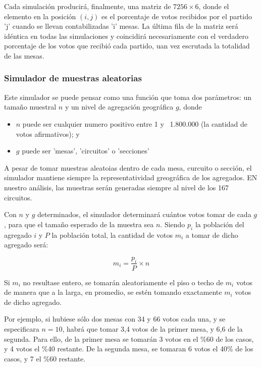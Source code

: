 \documentclass[12pt, a4paper]{article}
\begin{document}
Cada simulaci\'on producir\'a, finalmente, una matriz de $7256 \times 6$, donde el elemento en la posici\'on $(i,j)$ es el porcentaje de votos recibidos por el partido 'j' cuando se llevan contabilizadas 'i' mesas. La \'ultima fila de la matriz ser\'a id\'entica en todas las simulaciones y coincidir\'a necesariamente con el verdadero porcentaje de los votos que recibi\'o cada partido, uan vez escrutada la totalidad de las mesas.

\subsubsection{Simulador de muestras aleatorias}

Este simulador se puede pensar como una funci\'on que toma dos par\'ametros: un tama\~no muestral $n$ y un nivel de agregaci\'on geogr\'afica $g$, donde 

\begin{itemize}
	\item $n$ puede ser cualquier numero positivo entre 1 y ~1.800.000 (la cantidad de votos afirmativos); y
	\item $g$ puede ser 'mesas', 'circuitos' o 'secciones'
\end{itemize}

A pesar de tomar muestras aleatoias dentro de cada mesa, curcuito o secci\'on, el simulador mantiene siempre la representatividad greogr\'afica de los agregados. EN nuestro an\'alisis, las muestras ser\'an generadas siempre al nivel de los 167 circuitos.

Con $n$ y $g$ determinados, el simulador determinar\'a cu\'antos votos tomar de cada $g$, para que el tama\~no esperado de la muestra sea $n$. Siendo $p_{i}$ la poblaci\'on del agregado $i$ y $P$ la poblaci\'on total, la cantidad de votos $m_{i}$ a tomar de dicho agregado ser\'a:

$$ m_{i} = \frac{p_{i}}{P} \times{} n $$

Si $m_{i}$ no resultase entero, se tomar\'an aleatoriamente el piso o techo de $m_{i}$ votos de manera que a la larga, en promedio, se est\'en tomando exactamente $m_{i}$ votos de dicho agregado.

Por ejemplo, si hubiese s\'olo dos mesas con 34 y 66 votos cada una, y se especificara $n=10$, habr\'a que tomar 3,4 votos de la primer mesa, y 6,6 de la segunda. Para ello, de la primer mesa se tomar\'an 3 votos en el \%60 de los casos, y 4 votos el \%40 restante. De la segunda mesa, se tomaran 6 votos el 40\% de los casos, y 7 el \%60 restante.
\end{document}
